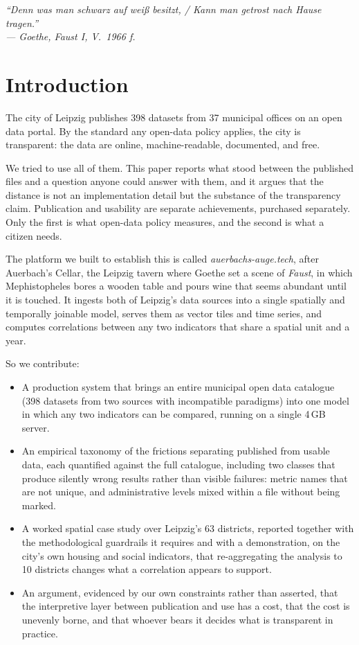 \documentclass[conference,a4paper]{IEEEtran}
\begin{document}
\begin{flushright}
\itshape
\small
``Denn was man schwarz auf wei\ss{} besitzt, / Kann man getrost nach Hause
tragen.''\footnotemark\\
--- Goethe, \textit{Faust I}, V.~1966 f.
\end{flushright}

\section{Introduction}

The city of Leipzig publishes 398 datasets from 37 municipal offices on an open
data portal. By the standard any open-data policy applies, the city is
transparent: the data are online, machine-readable, documented, and free.

We tried to use all of them. This paper reports what stood between the published
files and a question anyone could answer with them, and it argues that the
distance is not an implementation detail but the substance of the transparency
claim. Publication and usability are separate achievements, purchased
separately. Only the first is what open-data policy measures, and the second
is what a citizen needs.

The platform we built to establish this is called \emph{auerbachs-auge.tech},
after Auerbach's Cellar, the Leipzig tavern where Goethe set a scene of
\emph{Faust}, in which Mephistopheles bores a wooden table and pours wine that
seems abundant until it is touched. It ingests both of Leipzig's data sources
into a single spatially and temporally joinable model, serves them as vector
tiles and time series, and computes correlations between any two indicators that
share a spatial unit and a year.

So we contribute:

\begin{itemize}
\item A production system that brings an entire municipal open data catalogue
(398 datasets from two sources with incompatible paradigms) into one model
in which any two indicators can be compared, running on a single 4\,GB server.
\item An empirical taxonomy of the frictions separating published from usable
data, each quantified against the full catalogue, including two classes that
produce silently wrong results rather than visible failures: metric names that
are not unique, and administrative levels mixed within a file without being
marked.
\item A worked spatial case study over Leipzig's 63 districts, reported together
with the methodological guardrails it requires and with a demonstration, on
the city's own housing and social indicators, that re-aggregating the analysis
to 10 districts changes what a correlation appears to support.
\item An argument, evidenced by our own constraints rather than asserted, that
the interpretive layer between publication and use has a cost, that the cost is
unevenly borne, and that whoever bears it decides what is transparent in
practice.
\end{itemize}
\end{document}
